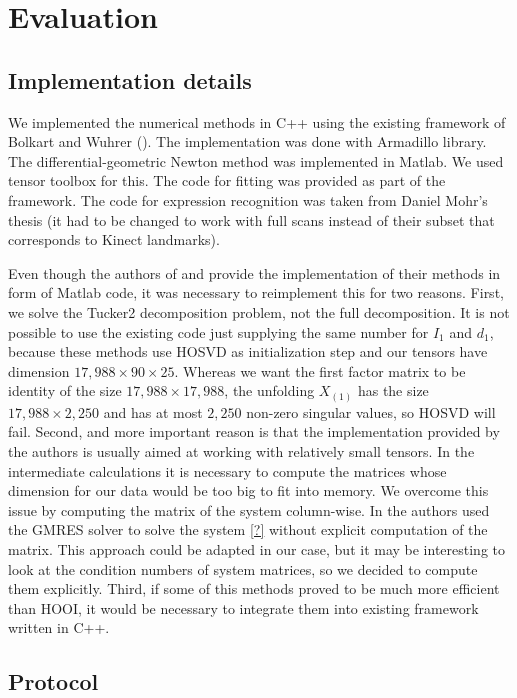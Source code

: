 \chapter{Evaluation}

\section{Implementation details}
We  implemented the numerical methods in C++ using the existing framework 
of Bolkart and Wuhrer (\cite{bolkart_wuhrer_2013}).
The implementation was done with Armadillo library.
The differential-geometric Newton method was implemented in Matlab. 
We used tensor toolbox for this.
The code for fitting was provided as part of the framework. The code for 
expression recognition was taken from Daniel Mohr's thesis
(it had to be changed to work with full scans instead of their subset
that corresponds to Kinect landmarks).



Even though the authors of \cite{elden_savas_2009}
and \cite{IDLAVH09} provide the implementation 
of their methods in form of Matlab code,
it was necessary to reimplement this for two reasons.
First, we solve the Tucker2 decomposition problem, not the
full decomposition. It is not possible to use the existing 
code just supplying the same number for $I_1$
and $d_1$, because these methods use HOSVD as initialization step
and our tensors have dimension $17,988 \times 90 \times 25$.
Whereas we want the first factor matrix to be identity of the size
$17,988 \times 17,988$, the unfolding $X_{(1)}$ has the size
$17,988 \times 2,250$ and has at most $2,250$ 
non-zero singular values, so HOSVD will fail.
Second, and more important reason is that the implementation
provided by the authors is usually aimed at working
with relatively small tensors. In the intermediate calculations
it is necessary to compute the matrices whose
dimension for our data would be too big to fit into memory.
We overcome this issue by computing the matrix of the 
system column-wise. In \cite{IDLAVH09} the authors
used the GMRES solver to solve the system \ref{?} without
explicit computation of the matrix. This approach could
be adapted in our case, but it may be interesting
to look at the condition numbers of system matrices, 
so we decided to compute them explicitly.
Third, if some of this methods proved to be much more
efficient than HOOI, it would be necessary to integrate 
them into existing framework written in C++.

\section{Protocol}

